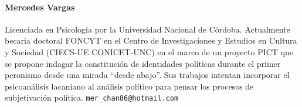 \paragraph{Mercedes Vargas}


Licenciada en Psicología por la Universidad Nacional de Córdoba. Actualmente becaria doctoral FONCYT en el Centro de Investigaciones y Estudios en Cultura y Sociedad (CIECS-UE CONICET-UNC) en el marco de un proyecto PICT que se propone indagar la constitución de identidades políticas durante el primer peronismo desde una mirada \enquote{desde abajo}. Sus trabajos intentan incorporar el psicoanálisis lacaniano al análisis político para pensar los procesos de subjetivación política. \nolinkurl{mer\_chan86@hotmail.com}


\printbibliography

\printnoidxglossary[type={acronym}]

\printnoidxglossary[type=main]      %


